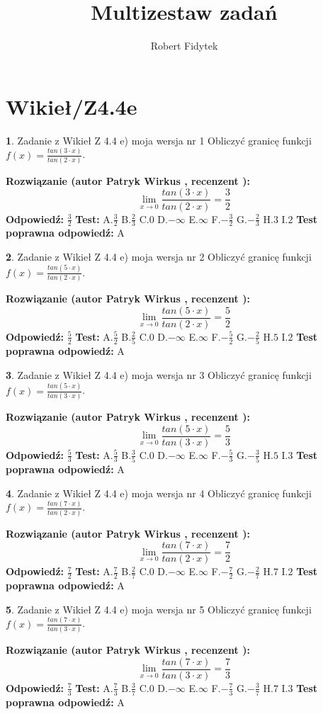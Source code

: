 \documentclass[12pt, a4paper]{article}
\title{Multizestaw zadań}
\author{Robert Fidytek}
\date{}
\theoremstyle{definition} %
\newtheorem{zad}{}
\newcommand{\kategoria}[1]{\section{#1}}
\newcommand{\zadStart}[1]{\begin{zad}#1\newline}
\newcommand{\zadStop}{\end{zad}}
\newcommand{\rozwStart}[2]{\noindent \textbf{Rozwiązanie (autor #1 , recenzent #2): }\newline}
\newcommand{\rozwStop}{\newline}
\newcommand{\odpStart}{\noindent \textbf{Odpowiedź:}\newline}
\newcommand{\odpStop}{\newline}
\newcommand{\testStart}{\noindent \textbf{Test:}\newline}
\newcommand{\testStop}{\newline}
\newcommand{\kluczStart}{\noindent \textbf{Test poprawna odpowiedź:}\newline}
\newcommand{\kluczStop}{\newline}
\begin{document}
\maketitle

\kategoria{Wikieł/Z4.4e}


\zadStart{Zadanie z Wikieł Z 4.4 e) moja wersja nr 1}
Obliczyć granicę funkcji $f(x)=\frac{tan(3\cdot x)}{tan(2\cdot x)}$.
\zadStop
\rozwStart{Patryk Wirkus}{}
$$\lim\limits_{x\to 0}\frac{tan(3\cdot x)}{tan(2\cdot x)}=
\frac{3}{2}$$
\rozwStop
\odpStart
$\frac{3}{2}$
\odpStop
\testStart
A.$\frac{3}{2}$
B.$\frac{2}{3}$
C.$0$
D.$-\infty$
E.$\infty$
F.$-\frac{3}{2}$
G.$-\frac{2}{3}$
H.$3$
I.$2$
\testStop
\kluczStart
A
\kluczStop



\zadStart{Zadanie z Wikieł Z 4.4 e) moja wersja nr 2}
Obliczyć granicę funkcji $f(x)=\frac{tan(5\cdot x)}{tan(2\cdot x)}$.
\zadStop
\rozwStart{Patryk Wirkus}{}
$$\lim\limits_{x\to 0}\frac{tan(5\cdot x)}{tan(2\cdot x)}=
\frac{5}{2}$$
\rozwStop
\odpStart
$\frac{5}{2}$
\odpStop
\testStart
A.$\frac{5}{2}$
B.$\frac{2}{5}$
C.$0$
D.$-\infty$
E.$\infty$
F.$-\frac{5}{2}$
G.$-\frac{2}{5}$
H.$5$
I.$2$
\testStop
\kluczStart
A
\kluczStop



\zadStart{Zadanie z Wikieł Z 4.4 e) moja wersja nr 3}
Obliczyć granicę funkcji $f(x)=\frac{tan(5\cdot x)}{tan(3\cdot x)}$.
\zadStop
\rozwStart{Patryk Wirkus}{}
$$\lim\limits_{x\to 0}\frac{tan(5\cdot x)}{tan(3\cdot x)}=
\frac{5}{3}$$
\rozwStop
\odpStart
$\frac{5}{3}$
\odpStop
\testStart
A.$\frac{5}{3}$
B.$\frac{3}{5}$
C.$0$
D.$-\infty$
E.$\infty$
F.$-\frac{5}{3}$
G.$-\frac{3}{5}$
H.$5$
I.$3$
\testStop
\kluczStart
A
\kluczStop



\zadStart{Zadanie z Wikieł Z 4.4 e) moja wersja nr 4}
Obliczyć granicę funkcji $f(x)=\frac{tan(7\cdot x)}{tan(2\cdot x)}$.
\zadStop
\rozwStart{Patryk Wirkus}{}
$$\lim\limits_{x\to 0}\frac{tan(7\cdot x)}{tan(2\cdot x)}=
\frac{7}{2}$$
\rozwStop
\odpStart
$\frac{7}{2}$
\odpStop
\testStart
A.$\frac{7}{2}$
B.$\frac{2}{7}$
C.$0$
D.$-\infty$
E.$\infty$
F.$-\frac{7}{2}$
G.$-\frac{2}{7}$
H.$7$
I.$2$
\testStop
\kluczStart
A
\kluczStop



\zadStart{Zadanie z Wikieł Z 4.4 e) moja wersja nr 5}
Obliczyć granicę funkcji $f(x)=\frac{tan(7\cdot x)}{tan(3\cdot x)}$.
\zadStop
\rozwStart{Patryk Wirkus}{}
$$\lim\limits_{x\to 0}\frac{tan(7\cdot x)}{tan(3\cdot x)}=
\frac{7}{3}$$
\rozwStop
\odpStart
$\frac{7}{3}$
\odpStop
\testStart
A.$\frac{7}{3}$
B.$\frac{3}{7}$
C.$0$
D.$-\infty$
E.$\infty$
F.$-\frac{7}{3}$
G.$-\frac{3}{7}$
H.$7$
I.$3$
\testStop
\kluczStart
A
\kluczStop
\end{document}
